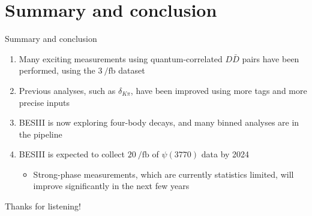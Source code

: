 \documentclass{beamer}
\begin{document}
\section{Summary and conclusion}
\begin{frame}{Summary and conclusion}
  \begin{enumerate}
    \setlength{\itemsep}{1.0em}
    \item{Many exciting measurements using quantum-correlated $D\bar{D}$ pairs have been performed, using the $\SI{3}{\per\femto\barn}$ dataset}
    \item{Previous analyses, such as $\delta_{K\pi}$, have been improved using more tags and more precise inputs}
    \item{BESIII is now exploring four-body decays, and many binned analyses are in the pipeline}
    \item{BESIII is expected to collect $\SI{20}{\per\femto\barn}$ of $\psi(3770)$ data by 2024}
    \begin{itemize}
      \item{Strong-phase measurements, which are currently statistics limited, will improve significantly in the next few years}
    \end{itemize}
  \end{enumerate}
  \begin{center}
    \huge Thanks for listening!
  \end{center}
\end{frame}
\end{document}
